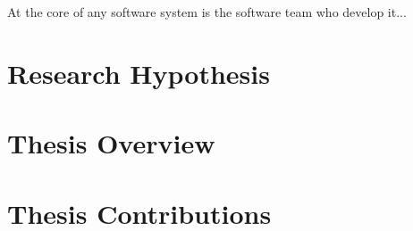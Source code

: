 
At the core of any software system is the software team who develop it...

\section{Research Hypothesis}

\conclusionbox{}  

\section{Thesis Overview}

\section{Thesis Contributions}